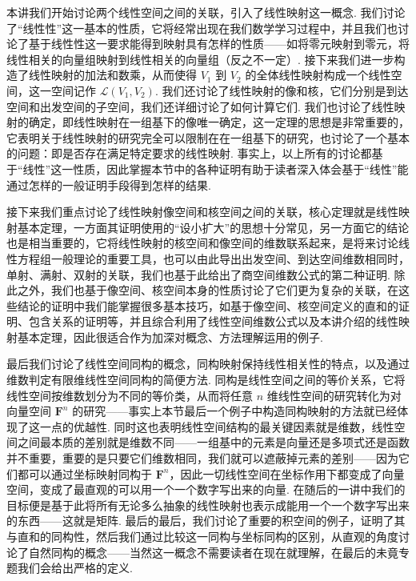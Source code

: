 \begin{summary}

    本讲我们开始讨论两个线性空间之间的关联，引入了线性映射这一概念. 我们讨论了``线性性''这一基本的性质，它将经常出现在我们数学学习过程中，并且我们也讨论了基于线性性这一要求能得到映射具有怎样的性质——如将零元映射到零元，将线性相关的向量组映射到线性相关的向量组（反之不一定）. 接下来我们进一步构造了线性映射的加法和数乘，从而使得 $V_1$ 到 $V_2$ 的全体线性映射构成一个线性空间，这一空间记作 $\mathcal{L}(V_1,V_2)$. 我们还讨论了线性映射的像和核，它们分别是到达空间和出发空间的子空间，我们还详细讨论了如何计算它们. 我们也讨论了线性映射的确定，即线性映射在一组基下的像唯一确定，这一定理的思想是非常重要的，它表明关于线性映射的研究完全可以限制在在一组基下的研究，也讨论了一个基本的问题：即是否存在满足特定要求的线性映射. 事实上，以上所有的讨论都基于``线性''这一性质，因此掌握本节中的各种证明有助于读者深入体会基于``线性''能通过怎样的一般证明手段得到怎样的结果.

    接下来我们重点讨论了线性映射像空间和核空间之间的关联，核心定理就是线性映射基本定理，一方面其证明使用的``设小扩大''的思想十分常见，另一方面它的结论也是相当重要的，它将线性映射的核空间和像空间的维数联系起来，是将来讨论线性方程组一般理论的重要工具，也可以由此导出出发空间、到达空间维数相同时，单射、满射、双射的关联，我们也基于此给出了商空间维数公式的第二种证明. 除此之外，我们也基于像空间、核空间本身的性质讨论了它们更为复杂的关联，在这些结论的证明中我们能掌握很多基本技巧，如基于像空间、核空间定义的直和的证明、包含关系的证明等，并且综合利用了线性空间维数公式以及本讲介绍的线性映射基本定理，因此很适合作为加深对概念、方法理解运用的例子.

    最后我们讨论了线性空间同构的概念，同构映射保持线性相关性的特点，以及通过维数判定有限维线性空间同构的简便方法. 同构是线性空间之间的等价关系，它将线性空间按维数划分为不同的等价类，从而将任意 $n$ 维线性空间的研究转化为对向量空间 $\mathbf{F}^n$ 的研究——事实上本节最后一个例子中构造同构映射的方法就已经体现了这一点的优越性. 同时这也表明线性空间结构的最关键因素就是维数，线性空间之间最本质的差别就是维数不同——一组基中的元素是向量还是多项式还是函数并不重要，重要的是只要它们维数相同，我们就可以遮蔽掉元素的差别——因为它们都可以通过坐标映射同构于 $\mathbf{F}^n$，因此一切线性空间在坐标作用下都变成了向量空间，变成了最直观的可以用一个一个数字写出来的向量. 在随后的一讲中我们的目标便是基于此将所有无论多么抽象的线性映射也表示成能用一个一个数字写出来的东西——这就是矩阵. 最后的最后，我们讨论了重要的积空间的例子，证明了其与直和的同构性，然后我们通过比较这一同构与坐标同构的区别，从直观的角度讨论了自然同构的概念——当然这一概念不需要读者在现在就理解，在最后的未竟专题我们会给出严格的定义.

\end{summary}

